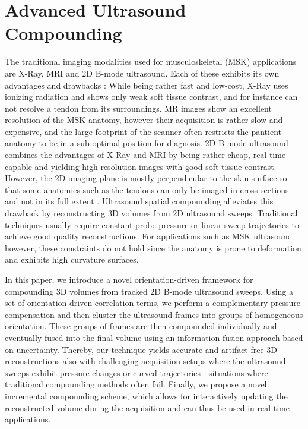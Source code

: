 %

\chapter{Advanced Ultrasound Compounding}
\label{chap:uscompounding}
The traditional imaging modalities used for musculoskeletal (MSK) applications are X-Ray, MRI and 2D B-mode ultrasound. 
Each of these exhibits its own advantages and drawbacks \cite{vanhoenacker2007orthopedicImaging}: 
While being rather fast and low-cost, X-Ray uses ionizing radiation and shows only weak soft tissue contrast, and for instance can not resolve a tendon from its surroundings.
MR images show an excellent resolution of the MSK anatomy, however their acquisition is rather slow and expensive, and the large footprint of the scanner often restricts the pantient anatomy to be in a sub-optimal position for diagnosis.
2D B-mode ultrasound combines the advantages of X-Ray and MRI by being rather cheap, real-time capable and yielding high resolution images with good soft tissue contrast.
However, the 2D imaging plane is mostly perpendicular to the skin surface so that some anatomies such as the tendons can only be imaged in cross sections and not in its full extent \cite{Noble06,Noble11}.
Ultrasound spatial compounding alleviates this drawback by reconstructing 3D volumes from 2D ultrasound sweeps.
Traditional techniques usually require constant probe pressure or linear sweep trajectories to achieve good quality reconstructions.
For applications such as MSK ultrasound however, these constraints do not hold since the anatomy is prone to deformation and exhibits high curvature surfaces.

In this paper, we introduce a novel orientation-driven framework for compounding 3D volumes from tracked 2D B-mode ultrasound sweeps.
Using a set of orientation-driven correlation terms, we perform a complementary pressure compensation and then cluster the ultrasound frames into groups of homogeneous orientation.
These groups of frames are then compounded individually and eventually fused into the final volume using an information fusion approach based on uncertainty.
Thereby, our technique yields accurate and artifact-free 3D reconstructions also with challenging acquisition setups where the ultrasound sweeps exhibit pressure changes or curved trajectories - situations where traditional compounding methods often fail.
Finally, we propose a novel incremental compounding scheme, which allows for interactively updating the reconstructed volume during the acquisition and can thus be used in real-time applications.


